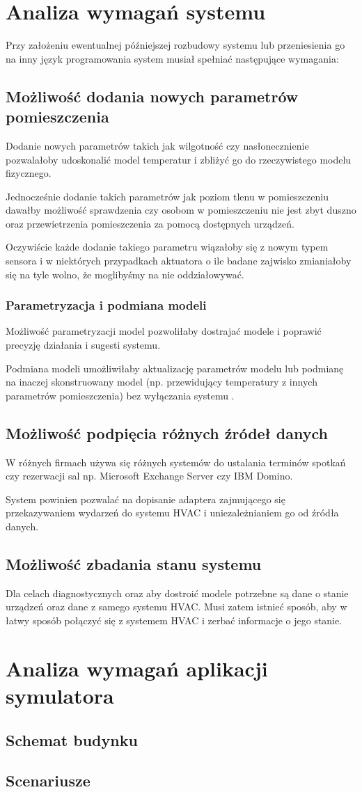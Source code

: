 \section{Analiza wymagań systemu}
Przy założeniu ewentualnej późniejszej rozbudowy systemu lub przeniesienia go na inny język programowania system musiał spełniać następujące wymagania:

\subsection*{Możliwość dodania nowych parametrów pomieszczenia}
Dodanie nowych parametrów takich jak wilgotność czy nasłonecznienie pozwalałoby udoskonalić model temperatur i zbliżyć go do rzeczywistego modelu fizycznego.

Jednocześnie dodanie takich parametrów jak poziom tlenu w pomieszczeniu dawałby możliwość sprawdzenia czy osobom w pomieszczeniu nie jest zbyt duszno oraz przewietrzenia pomieszczenia za pomocą dostępnych urządzeń.

Oczywiście każde dodanie takiego parametru wiązałoby się z nowym typem sensora i w niektórych przypadkach aktuatora o ile badane zajwisko zmianiałoby się na tyle wolno, że moglibyśmy na nie oddziałowywać.

\subsubsection*{Parametryzacja i podmiana modeli}
Możliwość parametryzacji model pozwoliłaby dostrajać modele i poprawić precyzję działania i sugesti systemu.

Podmiana modeli umożliwiłaby aktualizację parametrów modelu lub podmianę na inaczej skonstruowany model (np. przewidujący temperatury z innych parametrów pomieszczenia) bez wyłączania systemu . 

\subsection*{Możliwość podpięcia różnych źródeł danych}
W różnych firmach używa się różnych systemów do ustalania terminów spotkań czy rezerwacji sal np. Microsoft Exchange Server czy IBM Domino. 

System powinien pozwalać na dopisanie adaptera zajmującego się przekazywaniem wydarzeń do systemu HVAC i uniezależnianiem go od źródła danych.

\subsection*{Możliwość zbadania stanu systemu}
Dla celach diagnostycznych oraz aby dostroić modele potrzebne są dane o stanie urządzeń oraz dane z samego systemu HVAC. Musi zatem istnieć sposób, aby w łatwy sposób połączyć się z systemem HVAC i zerbać informacje o jego stanie.

\section{Analiza wymagań aplikacji symulatora}

\subsection{Schemat budynku}
\subsection{Scenariusze}
